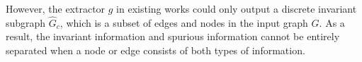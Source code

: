 However, the extractor $g$ in existing works could only output a discrete invariant subgraph $\widehat{G}_c$, which is a subset of edges and nodes in the input graph $G$. As a result, the invariant information and spurious information cannot be entirely separated when a node or edge consists of both types of information. 



\begin{comment}
    

\subsection{GRM Objective}
In this subsection, we formulate the three objectives of GRM for optimization. 


\mypara{Generation Objective.}
The optimization objective of our generator $g$ is to maximize the log-likelihood term $\log P(\widehat{G}_c|G,E)$, which is the probability of the generated adaptive subgraph $\widehat{G}_c$, conditioned on the input graph $G$ and the environment $E$. 


\mypara{Invariant Objective.}
To maximally capture the invariant information in the generated invariant subgraphs $\widehat{G}_c$, we propose to maximize the mutual information between $\widehat{G}_c$ and its label $Y$, i.e., $I(\widehat{G}_c ; Y)$. This objective is derived from the assumption that the invariant subgraph should be predictive of its label under different environments.

\mypara{Spurious Objective.}
To ensure the independence of the invariant subgraph $\widehat{G}_c$ and the environment $E$, it is imperative to reduce their correlations, generally represented as $\widehat{G}_c \perp E$. As the environment labels are typically unavailable, existing works have resorted to creating more environments or inferring environment labels. In our GRM framework, we propose to reduce the mutual information between $\widehat{G}_c$ and $E$. 

\mypara{Overall GRM Objective.}
The main idea of GRM is to generate invariant subgraphs such that they preserve crucial label-relevant information for classification while reducing the correlations between them and the environments. 


\end{comment}

